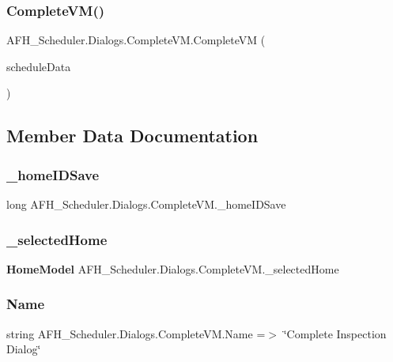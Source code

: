 \subsubsection{CompleteVM()}
{\footnotesize\ttfamily A\+F\+H\+\_\+\+Scheduler.\+Dialogs.\+Complete\+V\+M.\+Complete\+VM (\begin{DoxyParamCaption}\item[{\textbf{ Home\+Model}}]{schedule\+Data }\end{DoxyParamCaption})}



\subsection{Member Data Documentation}
\mbox{\label{class_a_f_h___scheduler_1_1_dialogs_1_1_complete_v_m_a4390eac978e150b9c74d23d3c5512efd}} 
\subsubsection{\_homeIDSave}
{\footnotesize\ttfamily long A\+F\+H\+\_\+\+Scheduler.\+Dialogs.\+Complete\+V\+M.\+\_\+home\+I\+D\+Save\hspace{0.3cm}{\ttfamily [static]}}

\mbox{\label{class_a_f_h___scheduler_1_1_dialogs_1_1_complete_v_m_a33bca1904ab53988458a6b3493f01fec}} 
\subsubsection{\_selectedHome}
{\footnotesize\ttfamily \textbf{ Home\+Model} A\+F\+H\+\_\+\+Scheduler.\+Dialogs.\+Complete\+V\+M.\+\_\+selected\+Home}

\mbox{\label{class_a_f_h___scheduler_1_1_dialogs_1_1_complete_v_m_ab7e4e7471d755535228dfb89ac78378b}} 
\subsubsection{Name}
{\footnotesize\ttfamily string A\+F\+H\+\_\+\+Scheduler.\+Dialogs.\+Complete\+V\+M.\+Name =$>$ \char`\"{}Complete Inspection Dialog\char`\"{}}



